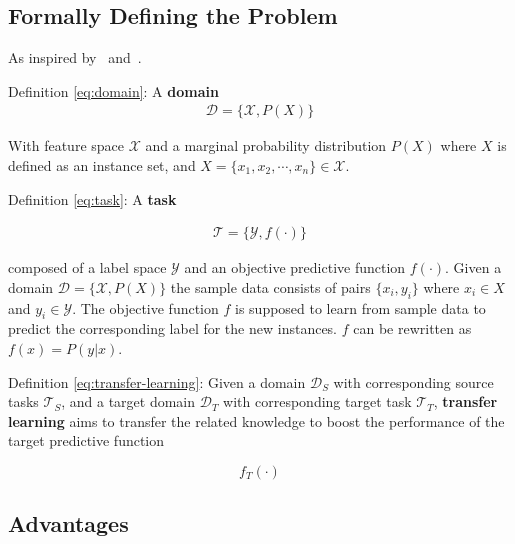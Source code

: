 \documentclass[11pt]{article}
\begin{document}
\subsection{Formally Defining the Problem}

As inspired by~\cite{concise-review-of-transfer-learning} and~\cite{survey-on-transfer-learning}.

Definition \ref{eq:domain}: A \textbf{domain} \begin{align}
    \mathcal{D} = \{\mathcal{X}, P(X)\}
    \label{eq:domain}
\end{align}

With feature space $\mathcal{X}$ and a marginal probability distribution $P(X)$ where $X$ is defined as an instance set, and $X = \{x_1, x_2, \cdots, x_n\} \in \mathcal{X}$.

\vspace{1em}

Definition \ref{eq:task}: A \textbf{task}

\begin{align}
    \mathcal{T} = \{\mathcal{Y}, f(\cdot)\}
    \label{eq:task}
\end{align}

composed of a label space $\mathcal{Y}$ and an objective predictive function $f(\cdot)$. Given a domain $\mathcal{D} = \{\mathcal{X}, P(X)\}$ the sample data consists of pairs $\{x_i, y_i\}$ where $x_i \in X$ and $y_i \in \mathcal{Y}$. The objective function $f$ is supposed to learn from sample data to predict the corresponding label for the new instances. $f$ can be rewritten as $f(x)=P(y|x)$.

\vspace{1em}

Definition \ref{eq:transfer-learning}: Given a domain $\mathcal{D}_S$ with corresponding source tasks $\mathcal{T}_S$, and a target domain $\mathcal{D}_T$ with corresponding target task $\mathcal{T}_T$, \textbf{transfer learning} aims to transfer the related knowledge to boost the performance of the target predictive function

\begin{equation}
    f_T(\cdot)
    \label{eq:transfer-learning}
\end{equation}

\subsection{Advantages}
\end{document}
